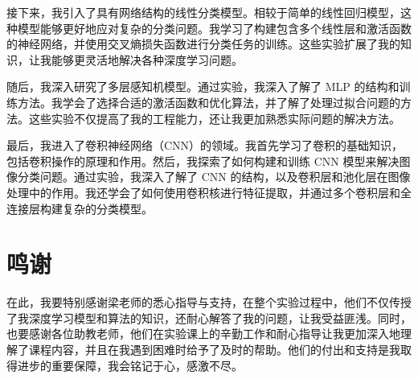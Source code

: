 \documentclass[a4paper,12pt]{article}
\begin{document}
接下来，我引入了具有网络结构的线性分类模型。相较于简单的线性回归模型，这种模型能够更好地应对复杂的分类问题。我学习了构建包含多个线性层和激活函数的神经网络，并使用交叉熵损失函数进行分类任务的训练。这些实验扩展了我的知识，让我能够更灵活地解决各种深度学习问题。

随后，我深入研究了多层感知机模型。通过实验，我深入了解了 MLP 的结构和训练方法。我学会了选择合适的激活函数和优化算法，并了解了处理过拟合问题的方法。这些实验不仅提高了我的工程能力，还让我更加熟悉实际问题的解决方法。

最后，我进入了卷积神经网络（CNN）的领域。我首先学习了卷积的基础知识，包括卷积操作的原理和作用。然后，我探索了如何构建和训练 CNN 模型来解决图像分类问题。通过实验，我深入了解了 CNN 的结构，以及卷积层和池化层在图像处理中的作用。我还学会了如何使用卷积核进行特征提取，并通过多个卷积层和全连接层构建复杂的分类模型。

\section*{鸣谢}
在此，我要特别感谢梁老师的悉心指导与支持，在整个实验过程中，他们不仅传授了我深度学习模型和算法的知识，还耐心解答了我的问题，让我受益匪浅。同时，也要感谢各位助教老师，他们在实验课上的辛勤工作和耐心指导让我更加深入地理解了课程内容，并且在我遇到困难时给予了及时的帮助。他们的付出和支持是我取得进步的重要保障，我会铭记于心，感激不尽。
\end{document}

